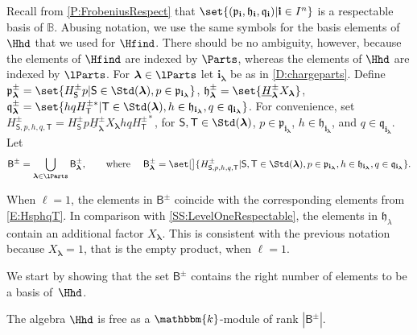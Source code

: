 \documentclass[a4paper,11pt]{amsart}
\newcommand\blam{{\boldsymbol\lambda}}
\newcommand\bi{\mathbf{i}}
\newcommand\ilam[1][\blam]{\bi_{#1}}
\numberwithin{equation}{subsection}
\theoremstyle{definition}
\theoremstyle{theorem}
\theoremstyle{remark}
\newcommand\plam[1][\lambda]{\mathfrak{p}_{#1}}
\newcommand\hlam[1][\lambda]{\mathfrak{h}_{#1}}
\newcommand\qlam[1][\lambda]{\mathfrak{q}_{#1}}
\newcommand\HJ{\underline{H}}
\newcommand\Basis[1][\pm]{\mathsf{B}^{#1}}
\newcommand\bS{{\mathsf{S}}}
\newcommand\bT{{\mathsf{T}}}
\newcommand\kk{\mathbbm{k}}
\newcommand{\Bo}{\mathbb{B}}
\begin{document}
Recall from \autoref{P:FrobeniusRespect} that
$\set{(\plam[\bi],\hlam[\bi],\qlam[\bi])|\bi\in I^n}$ is a
respectable basis of {$\Bo$}. Abusing notation, we use the same
symbols for the basis elements of $\Hhd$ that we used for $\Hfind$.
There should be no ambiguity, however, because the elements of $\Hfind$
are indexed by $\Parts$, whereas the elements of $\Hhd$ are indexed by $\lParts$.
{For $\blam\in\lParts$ let $\ilam$ be as in \autoref{D:chargeparts}.}
Define
$\plam[\blam]^\pm=\set{H^\pm_\bS p|\bS\in\Std(\blam), p\in\plam[\ilam]}$,
$\hlam[\blam]^\pm=\set{\HJ^\pm_\blam X_\blam}$,
$\qlam[\blam]^\pm=\set{hqH^{\pm*}_\bT|\bT\in\Std(\blam), h\in\hlam[\ilam],q\in\qlam[\ilam]}$.
For convenience, set
$H^\pm_{\bS, p,h,q,\bT} = H^\pm_\bS p \HJ^\pm_\blam X_\blam h qH^{\pm*}_\bT$,
for $\bS,\bT\in\Std(\blam)$, $p\in\plam[\ilam]$, $h\in\hlam[\ilam]$,
and $q\in\qlam[\ilam]$. Let
\begin{equation}\label{E:ellBasis}
    \Basis = \bigcup_{\blam\in\lParts}\Basis_\blam,\qquad
    \text{where }\quad
    \Basis_\blam=\set[\big]{H^\pm_{\bS,p,h,q,\bT}|
        \bS,\bT\in\Std(\blam),
        p\in\plam[\ilam],
        h\in\hlam[\ilam],
        q\in\qlam[\ilam]
    }.
\end{equation}
\begin{Remark}
When $\ell=1$, the elements in $\Basis$ coincide with the corresponding
elements from \autoref{E:HsphqT}. In comparison with
\autoref{SS:LevelOneRespectable}, the elements in $\hlam$ contain an
additional factor $X_\blam$. This is consistent with the previous
notation because $X_\blam=1$, that is the empty product,  when $\ell=1$.
\end{Remark}
We start by showing that the set $\Basis$ contains the right number of
elements to be a basis of~$\Hhd$.

\begin{Lemma}\label{L:lrank}
  The algebra $\Hhd$ is free as a $\kk$-module of rank {$|\Basis|$}.
\end{Lemma}
\end{document}
